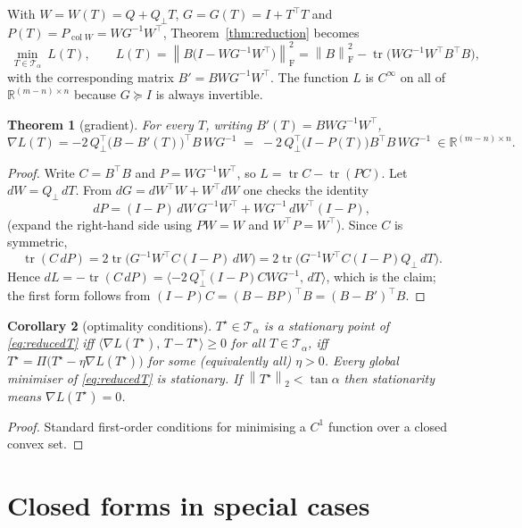 \documentclass[11pt]{article}
\newtheorem{theorem}{Theorem}[section]
\newtheorem{corollary}[theorem]{Corollary}
\theoremstyle{definition}
\newcommand{\R}{\mathbb{R}}
\newcommand{\col}{\operatorname{col}}
\newcommand{\tr}{\operatorname{tr}}
\newcommand{\norm}[1]{\left\lVert #1 \right\rVert}
\newcommand{\Fro}{\mathrm{F}}
\newcommand{\Qp}{Q_{\perp}}
\newcommand{\Pop}{\Pi}
\newcommand{\Tf}{\mathcal{T}}
\begin{document}
With $W=W(T)=Q+\Qp T$, $G=G(T)=I+T^\top T$ and $P(T)=P_{\col W}=WG^{-1}W^\top$, Theorem~\ref{thm:reduction} becomes
\begin{equation}\label{eq:reducedT}
  \boxed{\;\min_{T\in\Tf_\alpha}\ L(T),\qquad
  L(T)=\norm{B\bigl(I-W G^{-1}W^\top\bigr)}_\Fro^2=\norm B_\Fro^2-\tr\big(WG^{-1}W^\top B^\top B\big),\;}
\end{equation}
with the corresponding matrix $B'=BWG^{-1}W^\top$.
The function $L$ is $C^\infty$ on all of $\R^{(m-n)\times n}$ because $G\succeq I$ is always invertible.

\begin{theorem}[gradient]\label{thm:grad}
For every $T$, writing $B'(T)=BW G^{-1}W^\top$,
\begin{equation}
  \nabla L(T)= -2\,\Qp^\top\big(B-B'(T)\big)^\top B\,W G^{-1}
  \;=\;-2\,\Qp^\top\big(I-P(T)\big)B^\top B\,WG^{-1}\ \in\R^{(m-n)\times n}.
\end{equation}
\end{theorem}
\begin{proof}
Write $C=B^\top B$ and $P=WG^{-1}W^\top$, so $L=\tr C-\tr(PC)$. Let $dW=\Qp\,dT$. From $dG=dW^\top W+W^\top dW$ one checks the identity
\[
dP = (I-P)\,dW\,G^{-1}W^\top + WG^{-1}\,dW^\top(I-P),
\]
(expand the right-hand side using $P W=W$ and $W^\top P=W^\top$). Since $C$ is symmetric,
\[\tr(C\,dP)=2\tr\big(G^{-1}W^\top C(I-P)\,dW\big)=2\tr\big(G^{-1}W^\top C(I-P)\Qp\,dT\big).\]
Hence $dL=-\tr(C\,dP)=\langle -2\,\Qp^\top(I-P)CWG^{-1},\,dT\rangle$, which is the claim; the first form follows from $(I-P)C=(B-BP)^\top B=(B-B')^\top B$.
\end{proof}

\begin{corollary}[optimality conditions]\label{cor:kkt}
$T^\star\in\Tf_\alpha$ is a stationary point of \eqref{eq:reducedT} iff
$\langle\nabla L(T^\star),\,T-T^\star\rangle\ge0$ for all $T\in\Tf_\alpha$, iff $T^\star=\Pop\big(T^\star-\eta\nabla L(T^\star)\big)$ for some (equivalently all) $\eta>0$.
Every global minimiser of \eqref{eq:reducedT} is stationary. If $\norm{T^\star}_2<\tan\alpha$ then stationarity means $\nabla L(T^\star)=0$.
\end{corollary}
\begin{proof}
Standard first-order conditions for minimising a $C^1$ function over a closed convex set.
\end{proof}

\section{Closed forms in special cases}
\end{document}
